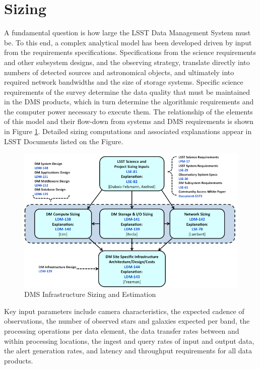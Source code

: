 \section{Sizing}\label{sizing}

A fundamental question is how large the LSST Data Management System must be. To
this end, a complex analytical model has been developed driven by input from
the requirements specifications. Specifications from the science requirements
and other subsystem designs, and the observing strategy, translate directly
into numbers of detected sources and astronomical objects, and ultimately into
required network bandwidths and the size of storage systems. Specific science
requirements of the survey determine the data quality that must be maintained
in the DMS products, which in turn determine the algorithmic requirements and
the computer power necessary to execute them. The relationship of the elements
of this model and their flow-down from systems and DMS requirements is shown in
Figure \ref{fig:sizing-model}. Detailed sizing computations and associated
explanations appear in LSST Documents listed on the Figure.

\begin{figure}
\centering
\includegraphics[width=\textwidth]{SizingModel.png}
\caption{DMS Infrastructure Sizing and Estimation}
\label{fig:sizing-model}
\end{figure}

Key input parameters include camera characteristics, the expected cadence of
observations, the number of observed stars and galaxies expected per band, the
processing operations per data element, the data transfer rates between and
within processing locations, the ingest and query rates of input and output
data, the alert generation rates, and latency and throughput requirements for
all data products. 

